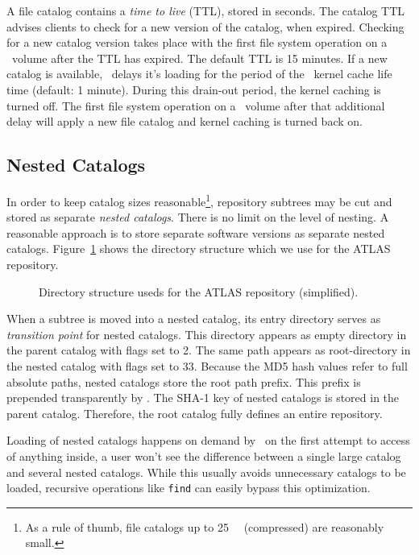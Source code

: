 A file catalog contains a \emph{time to live} (TTL), stored in seconds.
The catalog TTL advises clients to check for a new version of the catalog, when expired.
Checking for a new catalog version takes place with the first file system operation on a \cvmfs\ volume after the TTL has expired.
The default TTL is 15 minutes.
If a new catalog is available, \cvmfs\ delays it's loading for the period of the \cvmfs\ kernel cache life time (default: 1 minute).
During this drain-out period, the kernel caching is turned off.
The first file system operation on a \cvmfs\ volume after that additional delay will apply a new file catalog and kernel caching is turned back on.

\subsection{Nested Catalogs}
In order to keep catalog sizes reasonable\footnote{As a rule of thumb, file catalogs up to \SI{25}{\mega\byte} (compressed) are reasonably small.}, repository subtrees may be cut and stored as separate \emph{nested catalogs}.
There is no limit on the level of nesting.
A reasonable approach is to store separate software versions as separate nested catalogs.
Figure~\ref{fig:nested} shows the directory structure which we use for the ATLAS repository.
\begin{figure}
	\begin{center}
		\framebox{}
	\end{center}
	\caption{Directory structure useds for the ATLAS repository (simplified).}
	\label{fig:nested}
\end{figure}

When a subtree is moved into a nested catalog, its entry directory serves as \emph{transition point} for nested catalogs.
This directory appears as empty directory in the parent catalog with flags set to 2.
The same path appears as root-directory in the nested catalog with flags set to 33.
Because the MD5 hash values refer to full absolute paths, nested catalogs store the root path prefix.
This prefix is prepended transparently by \cvmfs.
The SHA-1 key of nested catalogs is stored in the parent catalog.
Therefore, the root catalog fully defines an entire repository.

Loading of nested catalogs happens on demand by \cvmfs\ on the first attempt to access of anything inside, \ie a user won't see the difference between a single large catalog and several nested catalogs.
While this usually avoids unnecessary catalogs to be loaded, recursive operations like \texttt{find} can easily bypass this optimization.

